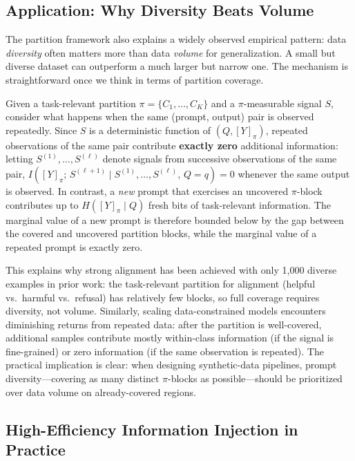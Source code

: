 \documentclass{article}
\theoremstyle{plain}
\theoremstyle{definition}
\theoremstyle{remark}
\begin{document}
\subsection{Application: Why Diversity Beats Volume}

The partition framework also explains a widely observed empirical pattern: data \emph{diversity} often matters more than data \emph{volume} for generalization. A small but diverse dataset can outperform a much larger but narrow one. The mechanism is straightforward once we think in terms of partition coverage.

Given a task-relevant partition $\pi=\{C_1,\dots,C_K\}$ and a $\pi$-measurable signal $S$, consider what happens when the same (prompt, output) pair is observed repeatedly. Since $S$ is a deterministic function of $(Q,[Y]_\pi)$, repeated observations of the same pair contribute \textbf{exactly zero} additional information: letting $S^{(1)},\dots,S^{(\ell)}$ denote signals from successive observations of the same pair, $I([Y]_\pi;\,S^{(\ell+1)}\mid S^{(1)},\dots,S^{(\ell)},\,Q{=}q)=0$ whenever the same output is observed. In contrast, a \textit{new} prompt that exercises an uncovered $\pi$-block contributes up to $H([Y]_\pi\mid Q)$ fresh bits of task-relevant information. The marginal value of a new prompt is therefore bounded below by the gap between the covered and uncovered partition blocks, while the marginal value of a repeated prompt is exactly zero.

This explains why strong alignment has been achieved with only 1{,}000 diverse examples in prior work: the task-relevant partition for alignment (helpful vs.\ harmful vs.\ refusal) has relatively few blocks, so full coverage requires diversity, not volume. Similarly, scaling data-constrained models encounters diminishing returns from repeated data: after the partition is well-covered, additional samples contribute mostly within-class information (if the signal is fine-grained) or zero information (if the same observation is repeated). The practical implication is clear: when designing synthetic-data pipelines, prompt diversity---covering as many distinct $\pi$-blocks as possible---should be prioritized over data volume on already-covered regions.

\subsection{High-Efficiency Information Injection in Practice}
\label{sec:high-efficiency}
\end{document}
